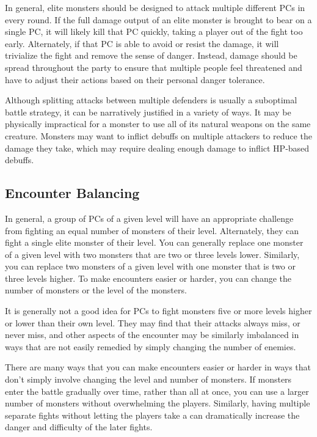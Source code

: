         In general, elite monsters should be designed to attack multiple different PCs in every round.
        If the full damage output of an elite monster is brought to bear on a single PC, it will likely kill that PC quickly, taking a player out of the fight too early.
        Alternately, if that PC is able to avoid or resist the damage, it will trivialize the fight and remove the sense of danger.
        Instead, damage should be spread throughout the party to ensure that multiple people feel threatened and have to adjust their actions based on their personal danger tolerance.

        Although splitting attacks between multiple defenders is usually a suboptimal battle strategy, it can be narratively justified in a variety of ways.
        It may be physically impractical for a monster to use all of its natural weapons on the same creature.
        Monsters may want to inflict debuffs on multiple attackers to reduce the damage they take, which may require dealing enough damage to inflict HP-based debuffs.

    \subsection{Encounter Balancing}\label{Encounter Balancing}
        In general, a group of PCs of a given level will have an appropriate challenge from fighting an equal number of monsters of their level.
        Alternately, they can fight a single elite monster of their level.
        You can generally replace one monster of a given level with two monsters that are two or three levels lower.
        Similarly, you can replace two monsters of a given level with one monster that is two or three levels higher.
        To make encounters easier or harder, you can change the number of monsters or the level of the monsters.

        It is generally not a good idea for PCs to fight monsters five or more levels higher or lower than their own level.
        They may find that their attacks always miss, or never miss, and other aspects of the encounter may be similarly imbalanced in ways that are not easily remedied by simply changing the number of enemies.

        There are many ways that you can make encounters easier or harder in ways that don't simply involve changing the level and number of monsters.
        If monsters enter the battle gradually over time, rather than all at once, you can use a larger number of monsters without overwhelming the players.
        Similarly, having multiple separate fights without letting the players take a  can dramatically increase the danger and difficulty of the later fights.

